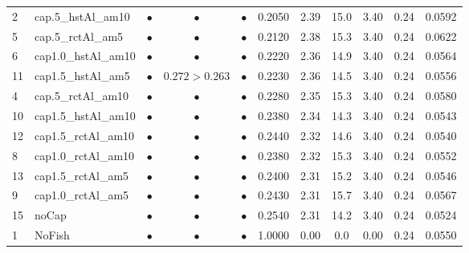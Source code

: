 \documentclass[11pt]{book}
\begin{document}
\begin{landscape}
\begin{longtable}[t]{llccccccccc}
2 & cap.5\_hstAl\_am10 & $\bullet$ & $\bullet$ & $\bullet$ & 0.2050 & 2.39 & 15.0 & 3.40 & 0.24 & 0.0592\\
5 & cap.5\_rctAl\_am5 & $\bullet$ & $\bullet$ & $\bullet$ & 0.2120 & 2.38 & 15.3 & 3.40 & 0.24 & 0.0622\\
6 & cap1.0\_hstAl\_am10 & $\bullet$ & $\bullet$ & $\bullet$ & 0.2220 & 2.36 & 14.9 & 3.40 & 0.24 & 0.0564\\
11 & cap1.5\_hstAl\_am5 & $\bullet$ & $0.272>0.263$ & $\bullet$ & 0.2230 & 2.36 & 14.5 & 3.40 & 0.24 & 0.0556\\
4 & cap.5\_rctAl\_am10 & $\bullet$ & $\bullet$ & $\bullet$ & 0.2280 & 2.35 & 15.3 & 3.40 & 0.24 & 0.0580\\
10 & cap1.5\_hstAl\_am10 & $\bullet$ & $\bullet$ & $\bullet$ & 0.2380 & 2.34 & 14.3 & 3.40 & 0.24 & 0.0543\\
12 & cap1.5\_rctAl\_am10 & $\bullet$ & $\bullet$ & $\bullet$ & 0.2440 & 2.32 & 14.6 & 3.40 & 0.24 & 0.0540\\
8 & cap1.0\_rctAl\_am10 & $\bullet$ & $\bullet$ & $\bullet$ & 0.2380 & 2.32 & 15.3 & 3.40 & 0.24 & 0.0552\\
13 & cap1.5\_rctAl\_am5 & $\bullet$ & $\bullet$ & $\bullet$ & 0.2400 & 2.31 & 15.2 & 3.40 & 0.24 & 0.0546\\
9 & cap1.0\_rctAl\_am5 & $\bullet$ & $\bullet$ & $\bullet$ & 0.2430 & 2.31 & 15.7 & 3.40 & 0.24 & 0.0567\\
15 & noCap & $\bullet$ & $\bullet$ & $\bullet$ & 0.2540 & 2.31 & 14.2 & 3.40 & 0.24 & 0.0524\\
1 & NoFish & $\bullet$ & $\bullet$ & $\bullet$ & 1.0000 & 0.00 & 0.0 & 0.00 & 0.24 & 0.0550\\*
\end{longtable}
\end{landscape}
\endgroup{}

\newpage
\end{document}
